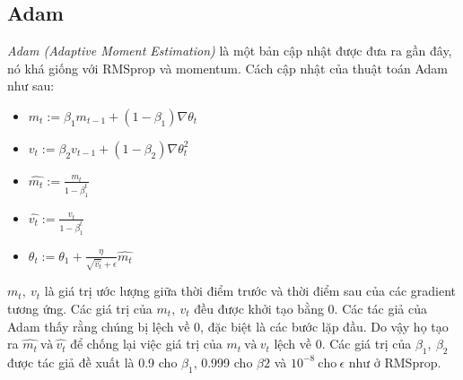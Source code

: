 \subsection{Adam}
\textit{Adam (Adaptive Moment Estimation)} là một bản cập nhật được đưa ra gần đây, nó khá giống với RMSprop và momentum. Cách cập nhật của thuật toán Adam như sau:
\begin{itemize}
\item[]  $m_t := \beta_1 m_{t-1} + (1-\beta_1) \nabla\theta_{t}$
\item[] $v_t := \beta_2 v_{t-1} + (1-\beta_2) \nabla\theta^2_{t}$
\item[] $ \widehat{m_t} := \frac{m_t}{1-\beta_1^{t}}$
\item[] $ \widehat{v_t} := \frac{v_t}{1-\beta_1^{t}} $
\item[] $\theta_t := \theta_1 + \frac{\eta }{\sqrt{\widehat{v_t}} +\epsilon}\widehat{m_t}$ 
\end{itemize}
$m_t,~v_t$ là giá trị ước lượng giữa thời điểm trước và thời điểm sau của các gradient tương ứng. Các giá trị của $m_t,~v_t$ đều được khởi tạo bằng 0. Các tác giả của Adam thấy rằng chúng bị lệch về 0, đặc biệt là các bước lặp đầu. Do vậy họ tạo ra $\widehat{m_t}~\text{và}~\widehat{v_t}$ để chống lại việc giá trị của $m_t ~\text{và}~ v_t$ lệch về 0. Các giá trị của $\beta_1,~\beta_2$ được tác giả đề xuất là 0.9 cho $\beta_1$, 0.999 cho $\beta2$  và $10^{-8} ~\text{cho}~ \epsilon$ như ở RMSprop.
